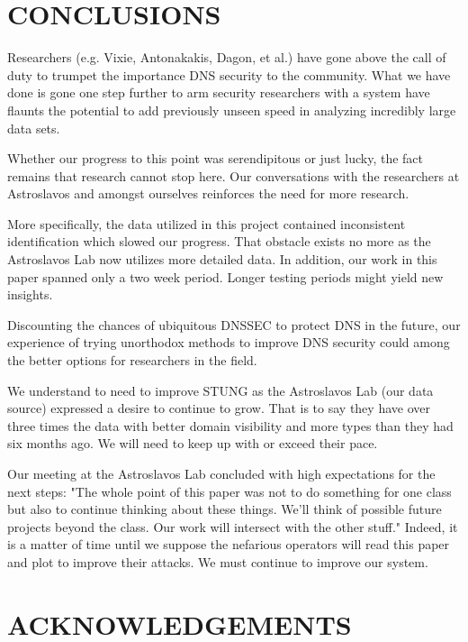 \documentclass{acm_proc_article-sp}
\begin{document}
\section{CONCLUSIONS}

Researchers (e.g. Vixie, Antonakakis, Dagon, et al.) have gone above the call of duty to trumpet the importance DNS security to the community.\cite{LectureB}  What we have done is gone one step further to arm security researchers with a system have flaunts the potential to add previously unseen speed in analyzing incredibly large data sets.

Whether our progress to this point was serendipitous or just lucky, the fact remains that research cannot stop here.  Our conversations with the researchers at Astroslavos and amongst ourselves reinforces the need for more research.

More specifically, the data utilized in this project contained inconsistent identification which slowed our progress.  That obstacle exists no more as the Astroslavos Lab now utilizes more detailed data.  In addition, our work in this paper spanned only a two week period.  Longer testing periods might yield new insights.

Discounting the chances of ubiquitous DNSSEC to protect DNS in the future, our experience of trying unorthodox methods to improve DNS security could among the better options for researchers in the field. 

We understand to need to improve STUNG as the Astroslavos Lab (our data source) expressed a desire to continue to grow.  That is to say they have over three times the data with better domain visibility and more types than they had six months ago.  We will need to keep up with or exceed their pace.   

Our meeting at the Astroslavos Lab concluded with high expectations for the next steps: "The whole point of this paper was not to do something for one class but also to continue thinking about these things.  We'll think of possible future projects beyond the class.  Our work will intersect with the other stuff."  Indeed, it is a matter of time until we suppose the nefarious operators will read this paper and plot to improve their attacks.  We must continue to improve our system.



\section{ACKNOWLEDGEMENTS}
\end{document}
